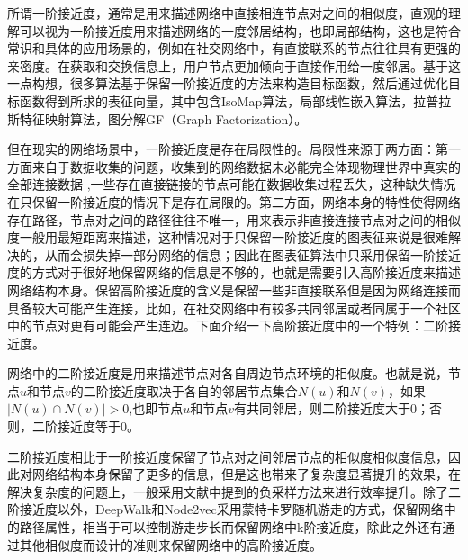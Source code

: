 所谓一阶接近度，通常是用来描述网络中直接相连节点对之间的相似度，直观的理解可以视为一阶接近度用来描述网络的一度邻居结构，也即局部结构，这也是符合常识和具体的应用场景的，例如在社交网络中，有直接联系的节点往往具有更强的亲密度。在获取和交换信息上，用户节点更加倾向于直接作用给一度邻居。基于这一点构想，很多算法基于保留一阶接近度的方法来构造目标函数，然后通过优化目标函数得到所求的表征向量，其中包含IsoMap算法，局部线性嵌入算法，拉普拉斯特征映射算法，图分解GF\cite{ahmed2013distributed}（Graph  Factorization）。

但在现实的网络场景中，一阶接近度是存在局限性的。局限性来源于两方面：第一方面来自于数据收集的问题，收集到的网络数据未必能完全体现物理世界中真实的全部连接数据\cite{liben2007link} ,一些存在直接链接的节点可能在数据收集过程丢失，这种缺失情况在只保留一阶接近度的情况下是存在局限的。第二方面，网络本身的特性使得网络存在路径，节点对之间的路径往往不唯一，用来表示非直接连接节点对之间的相似度一般用最短距离来描述，这种情况对于只保留一阶接近度的图表征来说是很难解决的，从而会损失掉一部分网络的信息；因此在图表征算法中只采用保留一阶接近度的方式对于很好地保留网络的信息是不够的，也就是需要引入高阶接近度来描述网络结构本身。保留高阶接近度的含义是保留一些非直接联系但是因为网络连接而具备较大可能产生连接，比如，在社交网络中有较多共同邻居或者同属于一个社区中的节点对更有可能会产生连边。下面介绍一下高阶接近度中的一个特例：二阶接近度。

\label{second_order}
网络中的二阶接近度是用来描述节点对各自周边节点环境的相似度。也就是说，节点$u$和节点$v$的二阶接近度取决于各自的邻居节点集合$N(u)$和$N(v)$，如果$|N(u) \cap N(v)|>0$,也即节点$u$和节点$v$有共同邻居，则二阶接近度大于0；否则，二阶接近度等于0。

二阶接近度相比于一阶接近度保留了节点对之间邻居节点的相似度相似度信息，因此对网络结构本身保留了更多的信息，但是这也带来了复杂度显著提升的效果，在解决复杂度的问题上，一般采用文献\cite{mikolov2013distributed}中提到的负采样方法来进行效率提升。除了二阶接近度以外，DeepWalk和Node2vec采用蒙特卡罗随机游走的方式，保留网络中的路径属性，相当于可以控制游走步长而保留网络中k阶接近度，除此之外还有通过其他相似度而设计的准则来保留网络中的高阶接近度\cite{ou2016asymmetric}。

